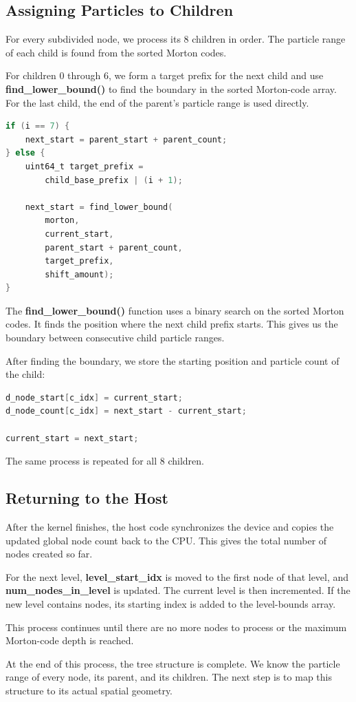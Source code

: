 \subsection{Assigning Particles to Children}

For every subdivided node, we process its 8 children in order. The particle range of each child is found from the sorted Morton codes.

For children 0 through 6, we form a target prefix for the next child and use \textbf{find\_lower\_bound()} to find the boundary in the sorted Morton-code array. For the last child, the end of the parent's particle range is used directly.

\begin{lstlisting}[language=C]
if (i == 7) {
    next_start = parent_start + parent_count;
} else {
    uint64_t target_prefix =
        child_base_prefix | (i + 1);

    next_start = find_lower_bound(
        morton,
        current_start,
        parent_start + parent_count,
        target_prefix,
        shift_amount);
}
\end{lstlisting}

The \textbf{find\_lower\_bound()} function uses a binary search on the sorted Morton codes. It finds the position where the next child prefix starts. This gives us the boundary between consecutive child particle ranges.

After finding the boundary, we store the starting position and particle count of the child:

\begin{lstlisting}[language=C]
d_node_start[c_idx] = current_start;
d_node_count[c_idx] = next_start - current_start;

current_start = next_start;
\end{lstlisting}

The same process is repeated for all 8 children.

\subsection{Returning to the Host}

After the kernel finishes, the host code synchronizes the device and copies the updated global node count back to the CPU. This gives the total number of nodes created so far.

For the next level, \textbf{level\_start\_idx} is moved to the first node of that level, and \textbf{num\_nodes\_in\_level} is updated. The current level is then incremented. If the new level contains nodes, its starting index is added to the level-bounds array.

This process continues until there are no more nodes to process or the maximum Morton-code depth is reached.

At the end of this process, the tree structure is complete. We know the particle range of every node, its parent, and its children. The next step is to map this structure to its actual spatial geometry.
